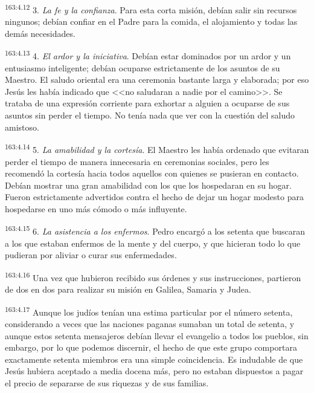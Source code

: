 \par 
\textsuperscript{163:4.12} 3. \textit{La fe y la confianza}. Para esta corta misión, debían salir sin recursos ningunos; debían confiar en el Padre para la comida, el alojamiento y todas las demás necesidades.

\par 
\textsuperscript{163:4.13} 4. \textit{El ardor y la iniciativa}. Debían estar dominados por un ardor y un entusiasmo inteligente; debían ocuparse estrictamente de los asuntos de su Maestro. El saludo oriental era una ceremonia bastante larga y elaborada; por eso Jesús les había indicado que <<no saludaran a nadie por el camino>>. Se trataba de una expresión corriente para exhortar a alguien a ocuparse de sus asuntos sin perder el tiempo. No tenía nada que ver con la cuestión del saludo amistoso.

\par 
\textsuperscript{163:4.14} 5. \textit{La amabilidad y la cortesía}. El Maestro les había ordenado que evitaran perder el tiempo de manera innecesaria en ceremonias sociales, pero les recomendó la cortesía hacia todos aquellos con quienes se pusieran en contacto. Debían mostrar una gran amabilidad con los que los hospedaran en su hogar. Fueron estrictamente advertidos contra el hecho de dejar un hogar modesto para hospedarse en uno más cómodo o más influyente.

\par 
\textsuperscript{163:4.15} 6. \textit{La asistencia a los enfermos}. Pedro encargó a los setenta que buscaran a los que estaban enfermos de la mente y del cuerpo, y que hicieran todo lo que pudieran por aliviar o curar sus enfermedades.

\par 
\textsuperscript{163:4.16} Una vez que hubieron recibido sus órdenes y sus instrucciones, partieron de dos en dos para realizar su misión en Galilea, Samaria y Judea.

\par 
\textsuperscript{163:4.17} Aunque los judíos tenían una estima particular por el número setenta, considerando a veces que las naciones paganas sumaban un total de setenta, y aunque estos setenta mensajeros debían llevar el evangelio a todos los pueblos, sin embargo, por lo que podemos discernir, el hecho de que este grupo comportara exactamente setenta miembros era una simple coincidencia. Es indudable de que Jesús hubiera aceptado a media docena más, pero no estaban dispuestos a pagar el precio de separarse de sus riquezas y de sus familias.

